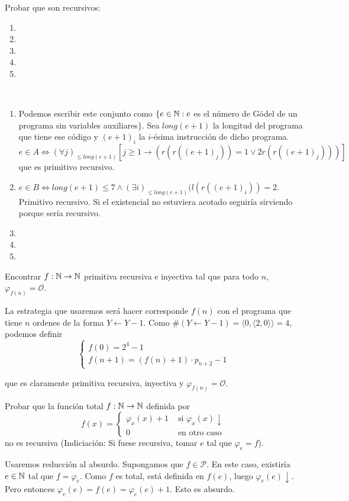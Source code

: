 \documentclass[twoside]{article}
\begin{document}
\newpage
\begin{ejercicio}{6}
Probar que son recursivos:
\begin{enumerate}
\item 
\item
\item
\item
\item
\end{enumerate}
\end{ejercicio}
\begin{solucion}\
\begin{enumerate}
\item Podemos escribir este conjunto como $\{e\in\mathbb{N}: e$ es el número de Gödel de un programa sin variables auxiliares$\}$. Sea $long(e+1)$ la longitud del programa que tiene ese código y $(e+1)_i$ la $i$-ésima instrucción de dicho programa. $e\in A\Leftrightarrow(\forall j)_{\leq long(e+1)}[j\geq 1\rightarrow (r(r((e+1)_j))=1\lor 2r(r((e+1)_j)))]$ que es primitivo recursivo.
\item $e\in B\Leftrightarrow long(e+1)\leq 7 \land (\exists i)_{\leq long(e+1)}(l(r((e+1)_i))=2$. Primitivo recursivo. Si el existencial no estuviera acotado seguiría sirviendo porque sería recursivo.
\item
\item
\item
\end{enumerate}
\end{solucion}
\newpage

\begin{ejercicio}{8}
Encontrar $f : \mathbb{N} \to \mathbb{N}$ primitiva recursiva e inyectiva tal que para todo $n$, $φ_{f(n)} = \mathcal{O}$.
\end{ejercicio}
\begin{solucion}
La estrategia que usaremos será hacer corresponde $f(n)$ con el programa que tiene $n$ ordenes de la forma $Y \leftarrow Y-1$. Como $\#(Y \leftarrow Y-1) = \langle 0, \langle 2,0\rangle \rangle = 4$, podemos definir
\[\begin{cases}
	f(0) = 2^4-1 \\
	f(n+1) = (f(n)+1)\cdot p_{n+2}-1
\end{cases}\]
\end{solucion}
que es claramente primitiva recursiva, inyectiva y $φ_{f(n)} = \mathcal{O}$.
\newpage
\begin{ejercicio}{9}
Probar que la función total $f : \mathbb{N} \to \mathbb{N}$ definida por
\[ f(x) = \begin{cases}
	φ_x(x)+1 &\text{ si }φ_x(x) \downarrow\\
	0 & \text{ en otro caso}
\end{cases}\]
no es recursiva (Indiciación: Si fuese recursiva, tomar $e$ tal que $φ_e = f$).
\end{ejercicio}
\begin{solucion}
Usaremos reducción al absurdo. Supongamos que $f \in \mathcal{P}$. En este caso, existiría $e \in \mathbb{N}$ tal que $f = φ_e$. Como $f$ es total, está definida en $f(e)$, luego $φ_e(e)\downarrow$. Pero entonces $φ_e(e) = f(e) = φ_e(e)+1$. Esto es absurdo.
\end{solucion}
\end{document}
